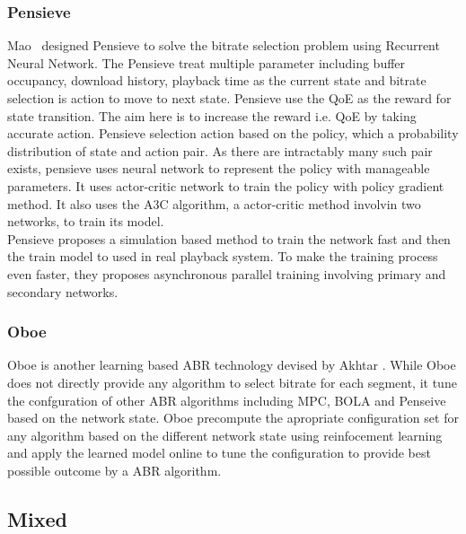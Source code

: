 \subsubsection{Pensieve}
Mao \etal\ designed Pensieve\cite{10.1145/3098822.3098843} to solve the bitrate selection problem using Recurrent Neural Network. The Pensieve treat multiple parameter including buffer occupancy, download history, playback time as the current state and bitrate selection is action to move to next state. Pensieve use the QoE as the reward for state transition. The aim here is to increase the reward i.e. QoE by taking accurate action. Pensieve selection action based on the policy, which a probability distribution of state and action pair. As there are intractably many such pair exists, pensieve uses neural network to represent the policy with manageable parameters. It uses actor-critic network to train the policy with policy gradient method\cite{sutton1999policy}. It also uses the A3C\cite{10.5555/3045390.3045594} algorithm, a actor-critic method involvin two networks, to train its model.\\
Pensieve proposes a simulation based method to train the network fast and then the train model to used in real playback system. To make the training process even faster, they proposes asynchronous parallel training involving primary and secondary networks.

\subsubsection{Oboe}
Oboe\cite{10.1145/3230543.3230558} is another learning based ABR technology devised by Akhtar \etal. While Oboe does not directly provide any algorithm to select bitrate for each segment, it tune the confguration of other ABR algorithms including MPC\cite{}, BOLA\cite{} and Penseive\cite{} based on the network state. Oboe precompute the apropriate configuration set for any algorithm based on the different network state using reinfocement learning and apply the learned model online to tune the configuration to provide best possible outcome by a ABR algorithm.

\subsection{Mixed}



